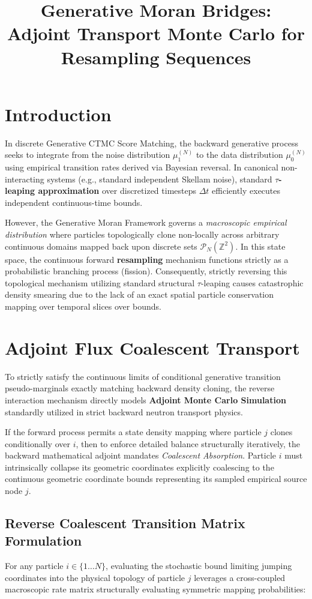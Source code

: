 \documentclass{article}
\title{Generative Moran Bridges:\\ Adjoint Transport Monte Carlo for Resampling Sequences}
\author{}
\date{}
\begin{document}
\maketitle

\section{Introduction}
In discrete Generative CTMC Score Matching, the backward generative process seeks to integrate from the noise distribution \(\mu_1^{(N)}\) to the data distribution \(\mu_0^{(N)}\) using empirical transition rates derived via Bayesian reversal. In canonical non-interacting systems (e.g., standard independent Skellam noise), standard \textbf{\(\tau\)-leaping approximation} over discretized timesteps \(\Delta t\) efficiently executes independent continuous-time bounds.

However, the Generative Moran Framework governs a \textit{macroscopic empirical distribution} where particles topologically clone non-locally across arbitrary continuous domains mapped back upon discrete sets \(\mathcal{P}_N(\mathbb{Z}^2)\). In this state space, the continuous forward \textbf{resampling} mechanism functions strictly as a probabilistic branching process (fission). Consequently, strictly reversing this topological mechanism utilizing standard structural \(\tau\)-leaping causes catastrophic density smearing due to the lack of an exact spatial particle conservation mapping over temporal slices over bounds. 

\section{Adjoint Flux Coalescent Transport}
To strictly satisfy the continuous limits of conditional generative transition pseudo-marginals exactly matching backward density cloning, the reverse interaction mechanism directly models \textbf{Adjoint Monte Carlo Simulation} standardly utilized in strict backward neutron transport physics.

If the forward process permits a state density mapping where particle \(j\) clones conditionally over \(i\), then to enforce detailed balance structurally iteratively, the backward mathematical adjoint mandates \textit{Coalescent Absorption}. Particle \(i\) must intrinsically collapse its geometric coordinates explicitly coalescing to the continuous geometric coordinate bounds representing its sampled empirical source node \(j\).

\subsection{Reverse Coalescent Transition Matrix Formulation}
For any particle \(i \in \{1 \dots N\}\), evaluating the stochastic bound limiting jumping coordinates into the physical topology of particle \(j\) leverages a cross-coupled macroscopic rate matrix structurally evaluating symmetric mapping probabilities:
\end{document}
